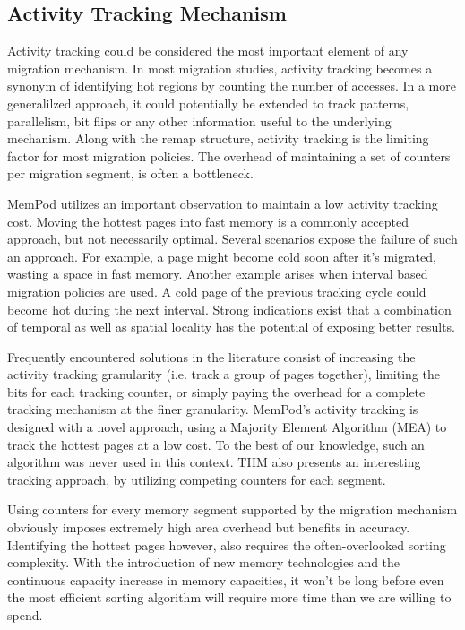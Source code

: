 \subsection{Activity Tracking Mechanism}
\label{sec:tracking}

Activity tracking could be considered the most important element of any migration mechanism. In most migration studies, activity tracking becomes a synonym of identifying hot regions by counting the number of accesses. In a more generalilzed approach, it could potentially be extended to track patterns, parallelism, bit flips or any other information useful to the underlying mechanism. Along with the remap structure, activity tracking is the limiting factor for most migration policies. The overhead of maintaining a set of counters per migration segment, is often a bottleneck. 

MemPod utilizes an important observation to maintain a low activity tracking cost. Moving the hottest pages into fast memory is a commonly accepted approach, but not necessarily optimal. Several scenarios expose the failure of such an approach. For example, a page might become cold soon after it's migrated, wasting a space in fast memory. Another example arises when interval based migration policies are used. A cold page of the previous tracking cycle could become hot during the next interval. Strong indications exist that a combination of temporal as well as spatial locality has the potential of exposing better results. 

Frequently encountered solutions in the literature consist of increasing the activity tracking granularity (i.e. track a group of pages together), limiting the bits for each tracking counter, or simply paying the overhead for a complete tracking mechanism at the finer granularity. MemPod's activity tracking  is designed with a novel approach, using a Majority Element Algorithm (MEA) to track the hottest pages at a low cost. To the best of our knowledge, such an algorithm was never used in this context. THM also presents an interesting tracking approach, by utilizing competing counters for each segment.

Using counters for every memory segment supported by the migration mechanism obviously imposes extremely high area overhead but benefits in accuracy. Identifying the hottest pages however, also requires the often-overlooked sorting complexity. With the introduction of new memory technologies and the continuous capacity increase in memory capacities, it won't be long before even the most efficient sorting algorithm will require more time than we are willing to spend.

